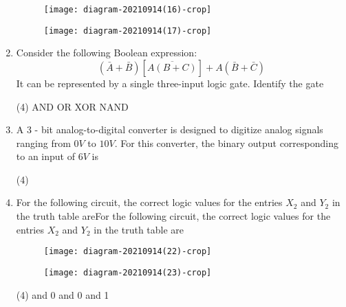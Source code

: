 \begin{enumerate}
\begin{tasks}
\begin{figure}[H]
		\end{figure}
		\task[\textbf{C.}]\begin{figure}[H]
			\centering
			\texttt{[image: diagram-20210914(16)-crop]}
		\end{figure}
		\task[\textbf{D.}] \begin{figure}[H]
			\centering
			\texttt{[image: diagram-20210914(17)-crop]}
		\end{figure}
	\end{tasks}
	\item Consider the following Boolean expression:
	$$
	(\bar{A}+\bar{B})[\overline{A(B+C)}]+A(\bar{B}+\bar{C})
	$$
	It can be represented by a single three-input logic gate. Identify the gate
	{}
	\begin{tasks}(4)
		\task[\textbf{A.}]  AND
		\task[\textbf{B.}] OR
		\task[\textbf{C.}] XOR
		\task[\textbf{D.}] NAND
	\end{tasks}
	\item A 3 - bit analog-to-digital converter is designed to digitize analog signals ranging from $0 V$ to $10 V$. For this converter, the binary output corresponding to an input of $6 V$ is
	{	}
	\begin{tasks}(4)
	\end{tasks}
	\item 	For the following circuit, the correct logic values for the entries $X_{2}$ and $Y_{2}$ in the truth table areFor the following circuit, the correct logic values for the entries $X_{2}$ and $Y_{2}$ in the truth table are
	{}\\
	\begin{minipage}{0.45\textwidth}
		\begin{figure}[H]
			\centering
			\texttt{[image: diagram-20210914(22)-crop]}
		\end{figure}
	\end{minipage}
	\begin{minipage}{0.45\textwidth}
		\begin{figure}[H]
			\centering
			\texttt{[image: diagram-20210914(23)-crop]}
		\end{figure}
	\end{minipage}
	\begin{tasks}(4)
		 and 0
		 and 0 
		 and 1

\end{tasks}
\end{enumerate}
